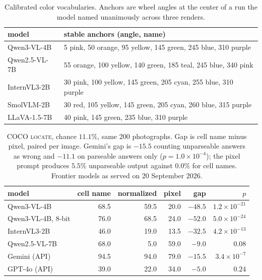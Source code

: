 \documentclass{article}
\begin{document}
\begin{table}[h]
\centering
\caption{Calibrated color vocabularies. Anchors are wheel angles at the center of
a run the model named unanimously across three renders.}
\label{tab:models}
\small
\begin{tabular}{ll}
\toprule
model & stable anchors (angle, name) \\
\midrule
Qwen3-VL-4B   & 5 pink, 50 orange, 95 yellow, 145 green, 245 blue, 310 purple \\
Qwen2.5-VL-7B & 55 orange, 100 yellow, 140 green, 185 teal, 245 blue, 340 pink \\
InternVL3-2B  & 30 pink, 100 yellow, 145 green, 205 cyan, 255 blue, 310 purple \\
SmolVLM-2B    & 30 red, 105 yellow, 145 green, 205 cyan, 260 blue, 315 purple \\
LLaVA-1.5-7B  & 40 pink, 145 green, 235 blue, 310 purple \\
\bottomrule
\end{tabular}
\end{table}

\begin{table}[h]
\centering
\caption{COCO \textsc{locate}, chance $11.1\%$, same 200 photographs. Gap is
cell name minus pixel, paired per image. Gemini's gap is $-15.5$ counting
unparseable answers as wrong and $-11.1$ on parseable answers only
($p=1.0\times10^{-4}$); the pixel prompt produces $5.5\%$ unparseable output
against $0.0\%$ for cell names. Frontier models as served on 20 September 2026.}
\label{tab:fivecoco}
\begin{tabular}{lrrrrr}
\toprule
model & cell name & normalized & pixel & gap & $p$ \\
\midrule
Qwen3-VL-4B    & 68.5 & 59.5 & 20.0 & $-48.5$ & $1.2\times10^{-21}$ \\
Qwen3-VL-4B, 8-bit & 76.0 & 68.5 & 24.0 & $-52.0$ & $5.0\times10^{-24}$ \\
InternVL3-2B   & 46.0 & 19.0 & 13.5 & $-32.5$ & $4.2\times10^{-13}$ \\
Qwen2.5-VL-7B  & 68.0 &  5.0 & 59.0 &  $-9.0$ & $0.08$ \\
Gemini (API)   & 94.5 & 94.0 & 79.0 & $-15.5$ & $3.4\times10^{-7}$ \\
GPT-4o (API)   & 39.0 & 22.0 & 34.0 &  $-5.0$ & $0.24$ \\
\bottomrule
\end{tabular}
\end{table}
\end{document}

